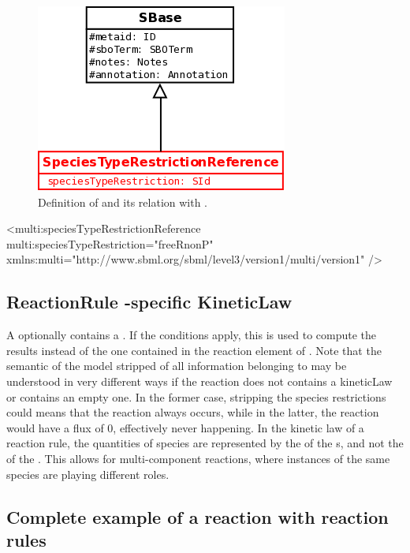 \begin{figure}[H]
\begin{center}
\includegraphics[scale=0.3]{figs/pngs/SpeciesTypeRestrictionReferenceClass.png} 
\caption{Definition of  and its relation with .}
\label{fig:ConditionClass}
\end{center}
\end{figure}

\begin{example}
<multi:speciesTypeRestrictionReference multi:speciesTypeRestriction="freeRnonP"
          xmlns:multi="http://www.sbml.org/sbml/level3/version1/multi/version1" />
\end{example}

\subsection{ReactionRule -specific KineticLaw}

A  optionally contains a . If the conditions apply, this  is used to compute the results instead of the one contained in the reaction element of \sbmlLthreeVone. Note that the semantic of the model stripped of all information belonging to \multiVone may be understood in very different ways if the reaction does not contains a kineticLaw or contains an empty one. In the former case, stripping the species restrictions could means that the reaction always occurs, while in the latter, the reaction would have a flux of 0, effectively never happening. In the kinetic law of a reaction rule, the quantities of species are represented by the  of the s, and not the  of the  . This allows for multi-component reactions, where instances of the same species are playing different roles.

\subsection{Complete example of a reaction with reaction rules}


